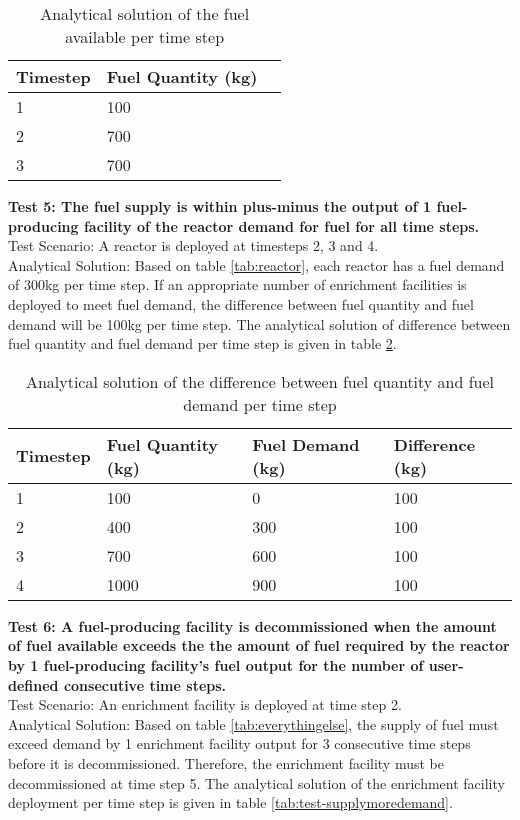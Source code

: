 \documentclass[12pt,letterpaper]{article}
\begin{document}
\begin{table}[H]
     \centering
    \begin{tabularx}{\textwidth}{bbb}
       \hline
       Timestep & Fuel Quantity (kg)  \\
       \hline
       1 & 100 \\
       2 & 700 \\
       3 & 700\\
       \hline
    \end{tabularx}
    \caption {Analytical solution of the fuel available per time step}
    \label{tab:test-fueldemand}
\end{table}

\noindent
\textbf{Test 5: The fuel supply is within plus-minus the output of 1 fuel-producing facility of the reactor demand for fuel for all time steps.} \\
Test Scenario: A reactor is deployed at timesteps 2, 3 and 4.\\
Analytical Solution: Based on table \ref{tab:reactor}, each reactor has a fuel demand of 300kg per time step. If an appropriate number of enrichment facilities is deployed to meet fuel demand, the difference between fuel quantity and fuel demand will be 100kg per time step. The analytical solution of difference between fuel quantity and fuel demand per time step is given in table \ref{tab:test-fueldiff}.  

\begin{table}[H]
     \centering
    \begin{tabularx}{\textwidth}{bbbb}
       \hline
       Timestep & Fuel Quantity (kg) & Fuel Demand (kg) & Difference (kg)\\
       \hline
       1 & 100 & 0 &100\\
       2 & 400 & 300 &100\\
       3 & 700 & 600 &100\\
       4 & 1000 & 900 &100\\
       \hline
    \end{tabularx}
    \caption {Analytical solution of the difference between fuel quantity and fuel demand per time step}
    \label{tab:test-fueldiff}
\end{table}

\noindent
\textbf{Test 6: A fuel-producing facility is decommissioned when the amount of fuel available exceeds the the amount of fuel required by the reactor by 1 fuel-producing facility's fuel output for the number of user-defined consecutive time steps.} \\
Test Scenario: An enrichment facility is deployed at time step 2. \\
Analytical Solution: Based on table \ref{tab:everythingelse}, the supply of fuel must exceed demand by 1 enrichment facility output for 3 consecutive time steps before it is decommissioned. Therefore, the enrichment facility must be decommissioned at time step 5. The analytical solution of the enrichment facility deployment per time step is given in table \ref{tab:test-supplymoredemand}. 
\end{document}
